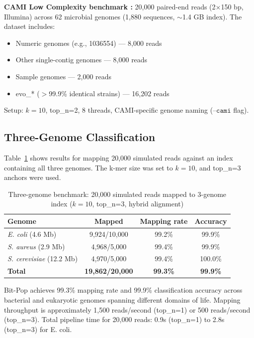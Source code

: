 \documentclass{article}
\begin{document}
\textbf{CAMI Low Complexity benchmark \citep{cami2018}:} 20,000 paired-end reads (2$\times$150 bp, Illumina) across 62 microbial genomes (1,880 sequences, $\sim$1.4 GB index). The dataset includes:
\begin{itemize}
    \item Numeric genomes (e.g., 1036554) --- 8,000 reads
    \item Other single-contig genomes --- 8,000 reads
    \item Sample\* genomes --- 2,000 reads
    \item evo\_* ($>$99.9\% identical strains) --- 16,202 reads
\end{itemize}
Setup: $k=10$, top\_n=2, 8 threads, CAMI-specific genome naming ($\texttt{--cami}$ flag).

\subsection{Three-Genome Classification}

Table~\ref{tab:multigenome} shows results for mapping 20,000 simulated reads against an index containing all three genomes. The k-mer size was set to $k=10$, and top\_n=3 anchors were used.

\begin{table}[H]
\centering
\caption{Three-genome benchmark: 20,000 simulated reads mapped to 3-genome index ($k=10$, top\_n=3, hybrid alignment)}
\label{tab:multigenome}
\begin{tabular}{lccc}
\toprule
\textbf{Genome} & \textbf{Mapped} & \textbf{Mapping rate} & \textbf{Accuracy} \\
\midrule
\textit{E. coli} (4.6 Mb) & 9,924/10,000 & 99.2\% & 99.9\% \\
\textit{S. aureus} (2.9 Mb) & 4,968/5,000 & 99.4\% & 99.9\% \\
\textit{S. cerevisiae} (12.2 Mb) & 4,970/5,000 & 99.4\% & 100.0\% \\
\midrule
\textbf{Total} & \textbf{19,862/20,000} & \textbf{99.3\%} & \textbf{99.9\%} \\
\bottomrule
\end{tabular}
\end{table}

Bit-Pop achieves 99.3\% mapping rate and 99.9\% classification accuracy across bacterial and eukaryotic genomes spanning different domains of life. Mapping throughput is approximately 1,500 reads/second (top\_n=1) or 500 reads/second (top\_n=3). Total pipeline time for 20,000 reads: 0.9s (top\_n=1) to 2.8s (top\_n=3) for E. coli.
\end{document}
